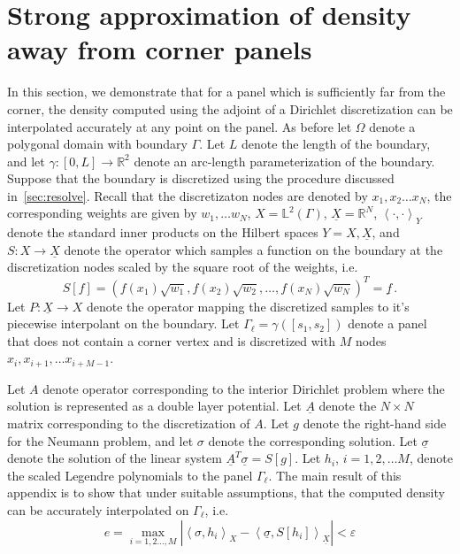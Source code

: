 \documentclass[12pt,times]{elsarticle}
\newcommand{\uA}{\underline{A}}
\newcommand{\usigma}{\underline{\sigma}}
\newcommand{\uX}{\underline{X}}
\newcommand{\upd}[1]{{\color{blue} #1}}
\begin{document}
\section{Strong approximation of density away from corner panels}
\label{sec:appb}
\upd{
In this section, we demonstrate that for a panel which is sufficiently far from the corner, the density computed using the adjoint of a Dirichlet discretization can be interpolated 
accurately at any point on the panel. As before let $\Omega$ denote a polygonal domain with boundary $\Gamma$. Let
$L$ denote the length of the boundary, and let $\gamma: [0,L]\to \mathbb{R}^2$ denote an arc-length parameterization of the boundary. Suppose that the boundary is discretized using the procedure discussed in~\cref{sec:resolve}. Recall that the discretizaton nodes are denoted by $x_{1},x_{2}\ldots x_{N}$, the corresponding weights are given by $w_{1}, \ldots w_{N}$, $X = \mathbb{L}^2({\Gamma})$, $\underline{X} = \mathbb{R}^{N}$, $\left< \cdot, \cdot \right>_{Y}$
denote the standard inner products on the Hilbert spaces $Y=X,\underline{X}$, and
$S:X \to \uX$ denote the operator which samples a function on the boundary at the discretization nodes scaled by the square root of the weights, i.e. 
\begin{equation}
S[f] = (f(x_{1})\sqrt{w_{1}},f(x_{2})\sqrt{w_{2}},\ldots, f(x_{N}) \sqrt{w_N} )^{T} = \underline{f} \, .
\end{equation}
Let $P:\underline{X} \to X$ denote the operator mapping the discretized samples to it's piecewise interpolant on the boundary.
Let $\Gamma_{\ell} = \gamma([s_{1},s_{2}])$ denote a panel that does not contain a corner vertex and is discretized with $M$ nodes  $x_{i},x_{i+1},\ldots x_{i+M-1}$.


Let $A$ denote operator corresponding to the interior Dirichlet problem where the solution is represented as a double layer potential. Let $\underline{A}$ denote the $N\times N$ matrix corresponding to the discretization of $A$. Let $g$ denote the
right-hand side for the Neumann problem, and let $\sigma$ denote the corresponding solution.   Let $\underline{\sigma}$ denote the solution of the linear system $\uA^{T} \usigma = S[g]$. Let $h_{i}$, $i=1,2,\ldots M$, denote the scaled Legendre polynomials to the panel $\Gamma_{\ell}$.
The main result of this appendix is to show that under suitable assumptions, that the computed density can be accurately interpolated on $\Gamma_{\ell}$, i.e.  
\begin{equation}
e = \max_{i=1,2\ldots, M} |\left< \sigma, h_{i} \right>_{X} -  \left< \usigma, S[h_{i}] \right>_{\uX}| < \varepsilon  
\end{equation}

}
\end{document}
